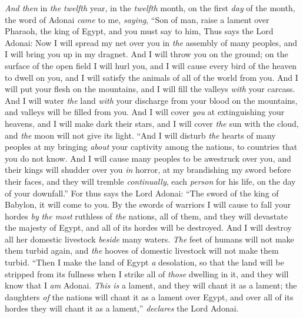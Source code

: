 \begin{biblechapter} %
 \textit{And then} in \textit{the twelfth} year, in the \textit{twelfth} month, on the first \textit{day} of the month, the word of Adonai \textit{came} to me, \textit{saying},
\verse “Son of man, raise a lament over Pharaoh, the king of Egypt, and you must say to him,
\verse Thus says the Lord Adonai:
\verse Now I will spread my net over you 
in \textit{the} assembly of many peoples, 
and I will bring you up in my dragnet.
\verse And I will throw you on the ground; 
on the surface of the open field I will hurl you, 
and I will cause every bird of the heaven to dwell on you, 
and I will satisfy the animals of all of the world from you.
\verse And I will put your flesh on the mountains, 
and I will fill the valleys \textit{with} your carcass.
\verse And I will water \textit{the} land \textit{with} your discharge from your blood 
on the mountains, 
and valleys will be filled from you.
\verse And I will cover \textit{you} at extinguishing your heavens, 
and I will make dark their stars, 
and I will cover \textit{the} sun with the cloud, 
and \textit{the} moon will not give its light.
\verse “And I will disturb \textit{the} hearts of many peoples 
at my bringing \textit{about} your captivity among the nations, 
to countries that you do not know.
\verse And I will cause many peoples to be awestruck over you, 
and their kings will shudder over you \textit{in} horror, 
at my brandishing my sword before their faces, 
and they will tremble \textit{continually}, 
each \textit{person} for his life, 
on the day of your downfall.”
\verse For thus says the Lord Adonai:
\verse “The sword of the king of Babylon, 
it will come to you.
\verse By the swords of warriors I will cause to fall your hordes 
\textit{by} \textit{the most} ruthless of \textit{the} nations, all of them, 
and they will devastate the majesty of Egypt, 
and all of its hordes will be destroyed.
\verse And I will destroy all her domestic livestock 
\textit{beside} many waters. 
\textit{The} feet of humans will not make them turbid again, 
and \textit{the} hooves of domestic livestock will not make them turbid.
\verse “Then I make the land of Egypt \textit{a} desolation, 
so that the land will be stripped from its fullness 
when I strike all of \textit{those} dwelling in it, 
and they will know that I \textit{am} Adonai.
\verse \textit{This is} a lament, and they will chant it as a lament; the daughters \textit{of} the nations will chant it as a lament over Egypt, and over all of its hordes they will chant it as a lament,” \textit{declares} the Lord Adonai.

\end{biblechapter}
